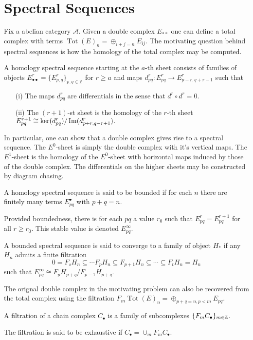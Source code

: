 \section{Spectral Sequences}
Fix a abelian category $\mathcal{A}$.
Given a double complex $E_{**}$ one can define a total complex with terms  $\operatorname{Tot}(E)_n = \oplus_{i+j=n} E_{ij}$.
The motivating question behind spectral sequences is how the homology of the total complex may be computed.
\begin{definition}
  A homology spectral sequence starting at the $a$-th sheet consists of families of objects $E_{\bullet \bullet}^r = \{E_{p,q}^r\}_{p,q\in \mathbb{Z}}$ for $r\geq a$ and maps
  $d_{pq}^r : E_{pq}^r \to E_{p-r,q+r-1}^r $
  such that
  \begin{enumerate}
    \item[(i)]  The maps $d^r_{pq}$ are differentials in the sense that
    $d^r \circ d^r = 0.$
    \item[(ii)] The $(r+1)$-st sheet is the homology of the $r$-th sheet
    $E_{pq}^{r+1} \cong \ker(d_{pq}^r)/ \operatorname{Im}(d_{p+r,q-r+1}^r).$
  \end{enumerate}
\end{definition}
In particular, one can show that a double complex gives rise to a spectral sequence.
The $E^0$-sheet is simply the double complex with it's vertical maps.
The $E^1$-sheet is the homology of the $E^0$-sheet with horizontal maps induced by those of the double complex.
The differentials on the higher sheets may be constructed by diagram chasing.
\begin{definition}
  A homology spectral sequence is said to be bounded if for each $n$ there are finitely many terms $E_{pq}^\bullet$ with $p+q = n$.
\end{definition}
Provided boundedness, there is for each $pq$ a value $r_0$ such that $E^{r}_{pq}= E^{r+1}_{pq}$ for all $r \geq r_0$. This stable value is denoted $E_{pq}^\infty$.
\begin{definition}
  A bounded spectral sequence is said to converge to a family of object $H_*$ if any $H_n$ admits a finite filtration
  $$0 = F_s H_n \subseteq \cdots F_p H_n \subseteq F_{p+1}H_n \subseteq \cdots \subseteq F_t H_n = H_n $$
  such that $E_{pq}^\infty \cong F_p H_{p+q} / F_{p-1} H_{p+q}$.
\end{definition}
The orignal double complex in the motivating problem can also be recovered from the total complex using the filtration $F_{m} \operatorname{Tot}(E)_n = \oplus_{p+q = n, p <m} E_{pq}.$
\begin{definition}
  A filtration of a chain complex $C_\bullet$ is a family of subcomplexes $\{F_m C_\bullet\}_{m\in \mathbb{Z}}$.

  The filtration is said to be exhaustive if $C_\bullet = \cup_m F_mC_\bullet$.
\end{definition}
